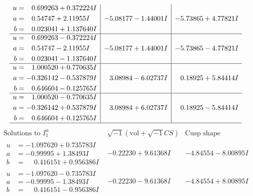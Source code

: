 \documentclass[1p]{elsarticle_modified}
\theoremstyle{definition}
\newcommand{\I}{\sqrt{-1}}
\begin{document}
$$\begin{array}{c|c|c}
\begin{aligned}
u &= \phantom{-}0.699263 + 0.372224 I \\
a &= \phantom{-}0.54747 + 2.11955 I \\
b &= \phantom{-}0.023041 + 1.137640 I\end{aligned}
 & -5.08177 - 1.44001 I & -5.73865 + 4.77821 I \\ \hline\begin{aligned}
u &= \phantom{-}0.699263 - 0.372224 I \\
a &= \phantom{-}0.54747 - 2.11955 I \\
b &= \phantom{-}0.023041 - 1.137640 I\end{aligned}
 & -5.08177 + 1.44001 I & -5.73865 - 4.77821 I \\ \hline\begin{aligned}
u &= \phantom{-}1.000520 + 0.770635 I \\
a &= -0.326142 - 0.537879 I \\
b &= \phantom{-}0.646604 - 0.125765 I\end{aligned}
 & \phantom{-}3.08984 - 6.02737 I & \phantom{-}0.18925 + 5.84414 I \\ \hline\begin{aligned}
u &= \phantom{-}1.000520 - 0.770635 I \\
a &= -0.326142 + 0.537879 I \\
b &= \phantom{-}0.646604 + 0.125765 I\end{aligned}
 & \phantom{-}3.08984 + 6.02737 I & \phantom{-}0.18925 - 5.84414 I\\
 \hline 
 \end{array}$$\newpage$$\begin{array}{c|c|c}  
\text{Solutions to }I^u_{1}& \I (\text{vol} + \sqrt{-1}CS) & \text{Cusp shape}\\
 \hline 
\begin{aligned}
u &= -1.097620 + 0.735783 I \\
a &= -0.99995 + 1.38493 I \\
b &= \phantom{-}0.416151 + 0.956386 I\end{aligned}
 & -0.22230 + 9.61368 I & -4.84554 - 8.00895 I \\ \hline\begin{aligned}
u &= -1.097620 - 0.735783 I \\
a &= -0.99995 - 1.38493 I \\
b &= \phantom{-}0.416151 - 0.956386 I\end{aligned}
 & -0.22230 - 9.61368 I & -4.84554 + 8.00895 I \\ \hline\begin{aligned}

\end{aligned}
\end{array}$$
\end{document}
